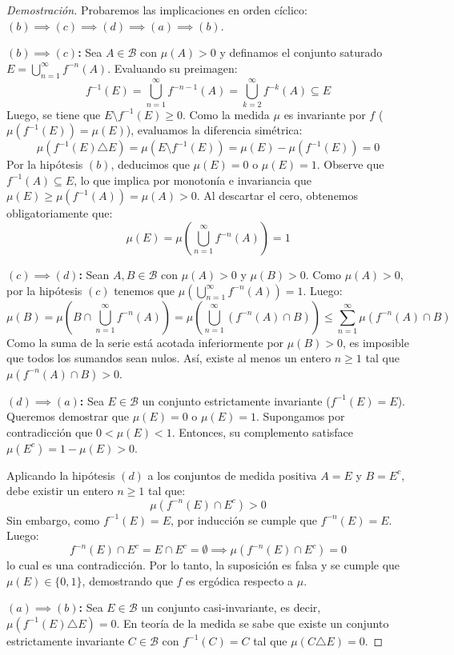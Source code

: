 \begin{proof}[Demostración]
	Probaremos las implicaciones en orden cíclico: $(b) \implies (c) \implies (d) \implies (a) \implies (b)$.
	
	\textbf{$(b) \implies (c)$:} Sea $A \in \mathcal{B}$ con $\mu(A) > 0$ y definamos el conjunto saturado $E = \bigcup_{n=1}^\infty f^{-n}(A)$. Evaluando su preimagen:
	$$ f^{-1}(E) = \bigcup_{n=1}^\infty f^{-n-1}(A) = \bigcup_{k=2}^\infty f^{-k}(A) \subseteq E $$
	Luego, se tiene que $E \setminus f^{-1}(E) \ge 0$. Como la medida $\mu$ es invariante por $f$ ($\mu(f^{-1}(E)) = \mu(E)$), evaluamos la diferencia simétrica:
	$$ \mu(f^{-1}(E) \triangle E) = \mu(E \setminus f^{-1}(E)) = \mu(E) - \mu(f^{-1}(E)) = 0 $$
	Por la hipótesis $(b)$, deducimos que $\mu(E) = 0$ o $\mu(E) = 1$. Observe que $f^{-1}(A) \subseteq E$, lo que implica por monotonía e invariancia que $\mu(E) \ge \mu(f^{-1}(A)) = \mu(A) > 0$. Al descartar el cero, obtenemos obligatoriamente que:
	$$ \mu(E) = \mu \left( \bigcup_{n=1}^\infty f^{-n}(A) \right) = 1 $$
	
	\textbf{$(c) \implies (d)$:} Sean $A, B \in \mathcal{B}$ con $\mu(A) > 0$ y $\mu(B) > 0$. Como $\mu(A) > 0$, por la hipótesis $(c)$ tenemos que $\mu \left( \bigcup_{n=1}^\infty f^{-n}(A) \right) = 1$. Luego:
	$$ \mu(B) = \mu \left( B \cap \bigcup_{n=1}^\infty f^{-n}(A) \right) = \mu \left( \bigcup_{n=1}^\infty (f^{-n}(A) \cap B) \right) \le \sum_{n=1}^\infty \mu(f^{-n}(A) \cap B) $$
	Como la suma de la serie está acotada inferiormente por $\mu(B) > 0$, es imposible que todos los sumandos sean nulos. Así, existe al menos un entero $n \ge 1$ tal que $\mu(f^{-n}(A) \cap B) > 0$.
	
	\textbf{$(d) \implies (a)$:} Sea $E \in \mathcal{B}$ un conjunto estrictamente invariante ($f^{-1}(E) = E$). Queremos demostrar que $\mu(E) = 0$ o $\mu(E) = 1$.
	Supongamos por contradicción que $0 < \mu(E) < 1$. Entonces, su complemento satisface $\mu(E^c) = 1 - \mu(E) > 0$.
	
	Aplicando la hipótesis $(d)$ a los conjuntos de medida positiva $A = E$ y $B = E^c$, debe existir un entero $n \ge 1$ tal que:
	$$ \mu(f^{-n}(E) \cap E^c) > 0 $$
	Sin embargo, como $f^{-1}(E) = E$, por inducción se cumple que $f^{-n}(E) = E$. Luego:
	$$ f^{-n}(E) \cap E^c = E \cap E^c = \emptyset \implies \mu(f^{-n}(E) \cap E^c) = 0 $$
	lo cual es una contradicción. Por lo tanto, la suposición es falsa y se cumple que $\mu(E) \in \{0, 1\}$, demostrando que $f$ es ergódica respecto a $\mu$.
	
	\textbf{$(a) \implies (b)$:} Sea $E \in \mathcal{B}$ un conjunto casi-invariante, es decir, $\mu(f^{-1}(E) \triangle E) = 0$. En teoría de la medida se sabe que existe un conjunto estrictamente invariante $C \in \mathcal{B}$ con $f^{-1}(C) = C$ tal que $\mu(C \triangle E) = 0$.
	

\end{proof}
